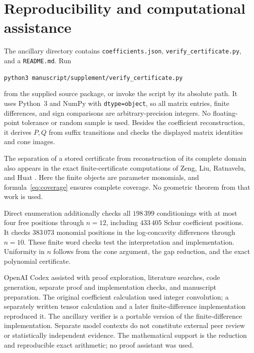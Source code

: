 \documentclass[11pt]{article}
\begin{document}
\section{Reproducibility and computational assistance}

The ancillary directory contains \texttt{coefficients.json},
\texttt{verify\_certificate.py}, and a \texttt{README.md}.
Run
\begin{center}
\texttt{python3 manuscript/supplement/verify\_certificate.py}
\end{center}
from the supplied source package, or invoke the script by its absolute path.
It uses Python~3 and NumPy with \texttt{dtype=object}, so all matrix entries,
finite differences, and sign comparisons are arbitrary-precision integers.
No floating-point tolerance or random sample is used.
Besides the coefficient reconstruction, it derives $P,Q$ from suffix
transitions and checks the displayed matrix identities and cone images.

The separation of a stored certificate from reconstruction of its complete
domain also appears in the exact finite-certificate computations of
Zeng, Liu, Ratnavelu, and Huat \cite{ZengCertificates}.
Here the finite objects are parameter monomials, and formula~\eqref{eq:coverage}
ensures complete coverage. No geometric theorem from that work is used.

Direct enumeration additionally checks all $198\,399$ conditionings with
at most four free positions through $n=12$, including $433\,405$ Schur
coefficient positions. It checks $383\,073$ monomial positions in the
log-concavity differences through $n=10$. These finite word checks test
the interpretation and implementation. Uniformity in $n$ follows from
the cone argument, the gap reduction, and the exact polynomial certificate.

OpenAI Codex assisted with proof exploration, literature searches,
code generation, separate proof and implementation checks, and manuscript
preparation. The original coefficient calculation used integer convolution;
a separately written tensor calculation and a later finite-difference
implementation reproduced it. The ancillary verifier is a portable version
of the finite-difference implementation. Separate model contexts do not
constitute external peer review or statistically independent evidence.
The mathematical support is the reduction and reproducible exact arithmetic;
no proof assistant was used.



\end{document}
